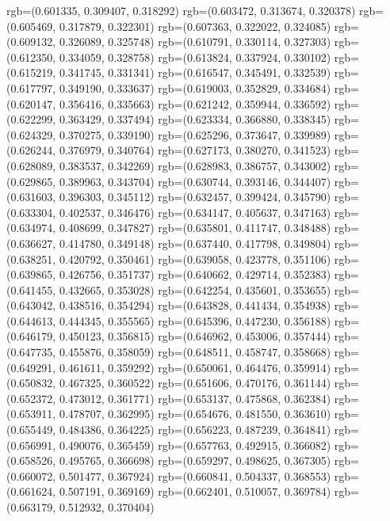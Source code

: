 {{{					rgb=(0.601335, 0.309407, 0.318292)
					rgb=(0.603472, 0.313674, 0.320378)
					rgb=(0.605469, 0.317879, 0.322301)
					rgb=(0.607363, 0.322022, 0.324085)
					rgb=(0.609132, 0.326089, 0.325748)
					rgb=(0.610791, 0.330114, 0.327303)
					rgb=(0.612350, 0.334059, 0.328758)
					rgb=(0.613824, 0.337924, 0.330102)
					rgb=(0.615219, 0.341745, 0.331341)
					rgb=(0.616547, 0.345491, 0.332539)
					rgb=(0.617797, 0.349190, 0.333637)
					rgb=(0.619003, 0.352829, 0.334684)
					rgb=(0.620147, 0.356416, 0.335663)
					rgb=(0.621242, 0.359944, 0.336592)
					rgb=(0.622299, 0.363429, 0.337494)
					rgb=(0.623334, 0.366880, 0.338345)
					rgb=(0.624329, 0.370275, 0.339190)
					rgb=(0.625296, 0.373647, 0.339989)
					rgb=(0.626244, 0.376979, 0.340764)
					rgb=(0.627173, 0.380270, 0.341523)
					rgb=(0.628089, 0.383537, 0.342269)
					rgb=(0.628983, 0.386757, 0.343002)
					rgb=(0.629865, 0.389963, 0.343704)
					rgb=(0.630744, 0.393146, 0.344407)
					rgb=(0.631603, 0.396303, 0.345112)
					rgb=(0.632457, 0.399424, 0.345790)
					rgb=(0.633304, 0.402537, 0.346476)
					rgb=(0.634147, 0.405637, 0.347163)
					rgb=(0.634974, 0.408699, 0.347827)
					rgb=(0.635801, 0.411747, 0.348488)
					rgb=(0.636627, 0.414780, 0.349148)
					rgb=(0.637440, 0.417798, 0.349804)
					rgb=(0.638251, 0.420792, 0.350461)
					rgb=(0.639058, 0.423778, 0.351106)
					rgb=(0.639865, 0.426756, 0.351737)
					rgb=(0.640662, 0.429714, 0.352383)
					rgb=(0.641455, 0.432665, 0.353028)
					rgb=(0.642254, 0.435601, 0.353655)
					rgb=(0.643042, 0.438516, 0.354294)
					rgb=(0.643828, 0.441434, 0.354938)
					rgb=(0.644613, 0.444345, 0.355565)
					rgb=(0.645396, 0.447230, 0.356188)
					rgb=(0.646179, 0.450123, 0.356815)
					rgb=(0.646962, 0.453006, 0.357444)
					rgb=(0.647735, 0.455876, 0.358059)
					rgb=(0.648511, 0.458747, 0.358668)
					rgb=(0.649291, 0.461611, 0.359292)
					rgb=(0.650061, 0.464476, 0.359914)
					rgb=(0.650832, 0.467325, 0.360522)
					rgb=(0.651606, 0.470176, 0.361144)
					rgb=(0.652372, 0.473012, 0.361771)
					rgb=(0.653137, 0.475868, 0.362384)
					rgb=(0.653911, 0.478707, 0.362995)
					rgb=(0.654676, 0.481550, 0.363610)
					rgb=(0.655449, 0.484386, 0.364225)
					rgb=(0.656223, 0.487239, 0.364841)
					rgb=(0.656991, 0.490076, 0.365459)
					rgb=(0.657763, 0.492915, 0.366082)
					rgb=(0.658526, 0.495765, 0.366698)
					rgb=(0.659297, 0.498625, 0.367305)
					rgb=(0.660072, 0.501477, 0.367924)
					rgb=(0.660841, 0.504337, 0.368553)
					rgb=(0.661624, 0.507191, 0.369169)
					rgb=(0.662401, 0.510057, 0.369784)
					rgb=(0.663179, 0.512932, 0.370404)
}}}
